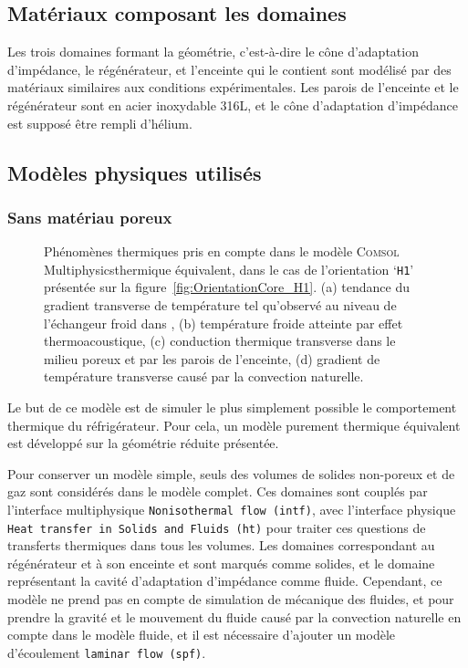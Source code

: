 \subsection{Matériaux composant les domaines}
Les trois domaines formant la géométrie, c'est-à-dire le cône d'adaptation d'impédance, le régénérateur, et l'enceinte qui le contient sont modélisé par des matériaux similaires aux conditions expérimentales. Les parois de l'enceinte et le régénérateur sont en acier inoxydable 316L, et le cône d'adaptation d'impédance est supposé être rempli d'hélium.

\subsection{Modèles physiques utilisés}
\subsubsection{Sans matériau poreux}
\begin{figure}[!ht]
    \centering
    
    \caption{Phénomènes thermiques pris en compte dans le modèle \textsc{Comsol} Multi\-physics\textss\textregistered thermique équivalent, dans le cas de l'orientation `\texttt{H1}' présentée sur la figure~\ref{fig:OrientationCore_H1}. (a) tendance du gradient transverse de température tel qu'observé au niveau de l'échangeur froid dans \cite{ramadan_design_2021}, (b) température froide atteinte par effet thermoacoustique, (c) conduction thermique transverse dans le milieu poreux et par les parois de l'enceinte, (d) gradient de température transverse causé par la convection naturelle.}
    \label{fig:SuperpositionComsol}
\end{figure}

Le but de ce modèle est de simuler le plus simplement possible le comportement thermique du réfrigérateur. Pour cela, un modèle purement thermique équivalent est développé sur la géométrie réduite présentée.

Pour conserver un modèle simple, seuls des volumes de solides non-poreux et de gaz sont considérés dans le modèle complet. Ces domaines sont couplés par l'interface multiphysique \texttt{Nonisothermal flow (intf)}, avec l'interface physique \texttt{Heat transfer in Solids and Fluids (ht)} pour traiter ces questions de transferts thermiques dans tous les volumes. Les domaines correspondant au régénérateur et à son enceinte et sont marqués comme solides, et le domaine représentant la cavité d'adaptation d'impédance comme fluide. Cependant, ce modèle ne prend pas en compte de simulation de mécanique des fluides, et pour prendre la gravité et le mouvement du fluide causé par la convection naturelle en compte dans le modèle fluide, et il est nécessaire d'ajouter un modèle d'écoulement \texttt{laminar flow (spf)}.

